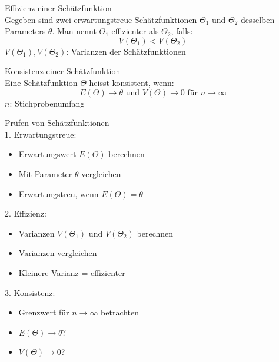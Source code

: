 \begin{definition}{Effizienz einer Schätzfunktion}\\
Gegeben sind zwei erwartungstreue Schätzfunktionen $\Theta_1$ und $\Theta_2$ desselben Parameters $\theta$. Man nennt $\Theta_1$ effizienter als $\Theta_2$, falls:
$$
V(\Theta_1)<V(\Theta_2)
$$
$V(\Theta_1), V(\Theta_2)$: Varianzen der Schätzfunktionen
\end{definition}

\begin{definition}{Konsistenz einer Schätzfunktion}\\
Eine Schätzfunktion $\Theta$ heisst konsistent, wenn:
$$
E(\Theta) \rightarrow \theta \text{ und } V(\Theta) \rightarrow 0 \text{ für } n \rightarrow \infty
$$
$n$: Stichprobenumfang
\end{definition}

\begin{KR}{Prüfen von Schätzfunktionen}\\
1. Erwartungstreue:
   \begin{itemize}
     \item Erwartungswert $E(\Theta)$ berechnen
     \item Mit Parameter $\theta$ vergleichen
     \item Erwartungstreu, wenn $E(\Theta)=\theta$
   \end{itemize}

2. Effizienz:
   \begin{itemize}
     \item Varianzen $V(\Theta_1)$ und $V(\Theta_2)$ berechnen
     \item Varianzen vergleichen
     \item Kleinere Varianz = effizienter
   \end{itemize}

3. Konsistenz:
   \begin{itemize}
     \item Grenzwert für $n \to \infty$ betrachten
     \item $E(\Theta) \to \theta$?
     \item $V(\Theta) \to 0$?
   \end{itemize}
\end{KR}

